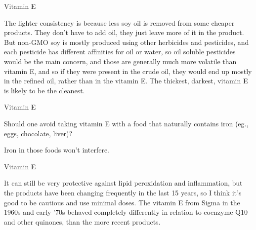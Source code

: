 \documentclass[11pt,oneside,openany,extrafontsizes]{memoir}
\begin{document}
\begin{standalonequote}{Vitamin E}

    \begin{answer}
        The lighter consistency is because less soy oil is removed from some cheaper products. They don't have to add oil, they just leave more of it in the product. But non-GMO soy is mostly produced using other herbicides and pesticides, and each pesticide has different affinities for oil or water, so oil soluble pesticides would be the main concern, and those are generally much more volatile than vitamin E, and so if they were present in the crude oil, they would end up mostly in the refined oil, rather than in the vitamin E. The thickest, darkest, vitamin E is likely to be the cleanest.
    \end{answer}
\end{standalonequote}

\begin{qaexchange}{Vitamin E}

    \begin{question}
        Should one avoid taking vitamin E with a food that naturally contains iron (eg., eggs, chocolate, liver)?
    \end{question}

    \begin{answer}
        Iron in those foods won't interfere.
    \end{answer}
\end{qaexchange}

\begin{standalonequote}{Vitamin E}

    \begin{answer}
        It can still be very protective against lipid peroxidation and inflammation, but the products have been changing frequently in the last 15 years, so I think it's good to be cautious and use minimal doses. The vitamin E from Sigma in the 1960s and early '70s behaved completely differently in relation to coenzyme Q10 and other quinones, than the more recent products.
    \end{answer}
\end{standalonequote}
\end{document}
